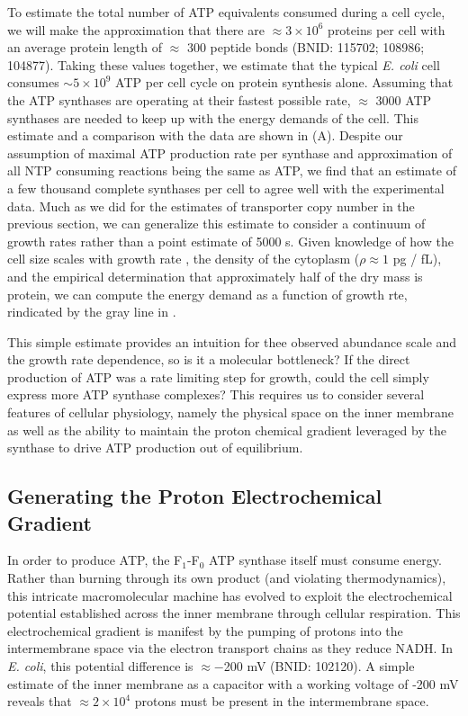 To estimate the total number of ATP equivalents consumed during a cell cycle,
we will make the approximation that there are $\approx 3\times10^6$ proteins
per cell with an average protein length of $\approx$ 300 peptide bonds (BNID:
115702; 108986; 104877). Taking these values together, we
estimate that the typical \textit{E. coli} cell consumes $\sim 5 \times
10^9$ ATP per cell cycle on protein synthesis alone. Assuming that the ATP synthases are operating at their
fastest possible rate, $\approx$ 3000 ATP synthases are needed to keep up
with the energy demands of the cell. This estimate and a comparison with the
data are shown in  (A). Despite our assumption of
maximal ATP production rate per synthase and approximation of all NTP
consuming reactions being the same as ATP, we find that an estimate of a few
thousand complete synthases per cell to agree well with the experimental
data. Much as we did for the estimates of transporter copy number in the
previous section, we can generalize this estimate to consider a continuum of growth rates rather than a
point estimate of 5000 s. Given knowledge of how the cell size scales with
growth rate \citep{si2017}, the density of the cytoplasm ($\rho \approx 1$ pg /
fL), and the empirical determination that approximately half of the dry mass is
protein, we can compute the energy demand as a function of growth rte, rindicated by the gray line in
.

This simple estimate provides an intuition for thee observed abundance scale
and the growth rate dependence, so is it a molecular bottleneck? If the
direct production of ATP was a rate limiting step for growth, could the cell
simply express more ATP synthase complexes? This requires us to consider
several features of cellular physiology, namely the physical space on the
inner membrane as well as the ability to maintain the proton chemical
gradient leveraged by the synthase to drive ATP production out of
equilibrium.

\subsection{Generating the Proton Electrochemical Gradient} In order to
produce ATP, the F$_1$-F$_0$ ATP synthase itself must consume energy. Rather
than burning through its own product (and violating thermodynamics), this
intricate macromolecular machine has evolved to exploit the electrochemical
potential established across the inner membrane through cellular respiration.
This electrochemical gradient is manifest by the pumping of protons into the
intermembrane space via the electron transport chains as they reduce NADH. In
\textit{E. coli}, this potential difference is $\approx -$200 mV (BNID:
102120). A simple estimate of the inner membrane as a capacitor with a
working voltage of -200 mV reveals that $\approx 2\times 10^4$ protons must
be present in the intermembrane space.

